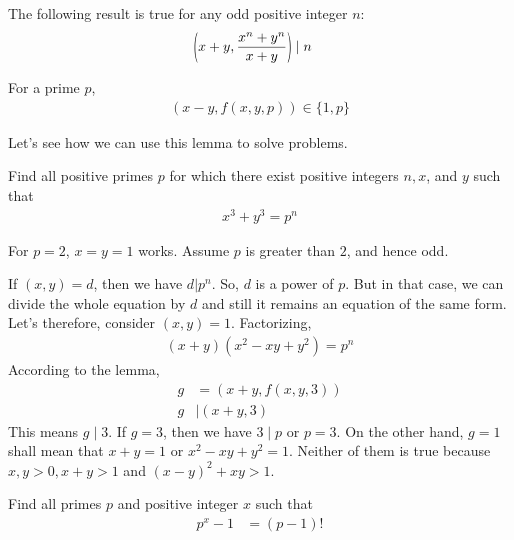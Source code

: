 \documentclass[main.tex]{subfile}
\begin{document}
	\begin{corollary}
		The following result is true for any odd positive integer $n$:
		\begin{align*}
			\func{}{x+y,\frac{x^n+y^n}{x+y}}
				& \mid n
		\end{align*}
	\end{corollary}

	\begin{corollary}
		For a prime $p$,
		\begin{align*}
			(x-y,f(x,y,p))\in\{1,p\}
		\end{align*}
	\end{corollary}

Let's see how we can use this lemma to solve problems.

	\begin{problem}[Hungary 2000]
		Find all positive primes $p$ for which there exist positive
		integers $n,x$, and $y$ such that
		\begin{align*}
			x^3+y^3=p^n
		\end{align*}
	\end{problem}

	\begin{solution}
		For $p=2$, $x=y=1$ works. Assume $p$ is greater than $2$, and hence odd.

		If $(x, y)=d$, then we have $d|p^n$. So, $d$ is a power of $p$. But in that case, we can divide the whole equation by $d$ and still it remains an equation of the same form. Let's therefore, consider $(x, y)=1$. Factorizing,
		\begin{align*}
			(x+y)(x^2-xy+y^2)=p^n
		\end{align*}
		According to the lemma,
		\begin{align*}
			g
				& =\left(x+y, f(x, y, 3)\right)\\
			g
				& \mid (x+y,3)
		\end{align*}
		This means $g\mid 3$. If $g=3$, then we have $3\mid p$ or $p=3$. On the other hand, $g=1$ shall mean that $x+y=1$ or $x^2-xy+y^2=1$. Neither of them is true because $x,y>0,x+y>1$ and $(x-y)^2+xy>1$.
	\end{solution}

	\begin{problem}
		Find all primes $p$ and positive integer $x$ such that
			\begin{align*}
				p^x-1 & = (p-1)!
			\end{align*}
	\end{problem}
\end{document}
